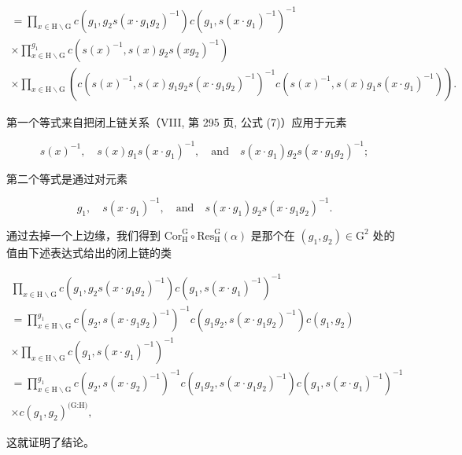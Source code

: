 \[
\begin{array}{l} = \prod_ {x \in \mathrm{H} \backslash \mathrm{G}} c (g _ {1}, g _ {2} s (x \cdot g _ {1} g _ {2}) ^ {- 1}) c (g _ {1}, s (x \cdot g _ {1}) ^ {- 1}) ^ {- 1} \\ \times \prod_ {x \in \mathrm{H} \backslash \mathrm{G}} ^ {g _ {1}} c (s (x) ^ {- 1}, s (x) g _ {2} s (x g _ {2}) ^ {- 1}) \\ \times \prod_ {x \in \mathrm{H} \backslash \mathrm{G}} \left(c (s (x) ^ {- 1}, s (x) g _ {1} g _ {2} s (x \cdot g _ {1} g _ {2}) ^ {- 1}) ^ {- 1} c (s (x) ^ {- 1}, s (x) g _ {1} s (x \cdot g _ {1}) ^ {- 1})\right). \end{array}
\]

第一个等式来自把闭上链关系（VIII, 第 295 页, 公式 (7)）应用于元素

\[
s (x) ^ {- 1}, \quad s (x) g _ {1} s (x \cdot g _ {1}) ^ {- 1}, \quad \mathrm{and} \quad s (x \cdot g _ {1}) g _ {2} s (x \cdot g _ {1} g _ {2}) ^ {- 1};
\]

第二个等式是通过对元素

\[
g _ {1}, \quad s (x \cdot g _ {1}) ^ {- 1}, \quad \mathrm{and} \quad s (x \cdot g _ {1}) g _ {2} s (x \cdot g _ {1} g _ {2}) ^ {- 1}.
\]

通过去掉一个上边缘，我们得到 \(\mathrm{Cor}_{\mathrm{H}}^{\mathrm{G}} \circ \mathrm{Res}_{\mathrm{H}}^{\mathrm{G}}(\alpha)\) 是那个在 \((g_{1}, g_{2}) \in \mathrm{G}^{2}\) 处的值由下述表达式给出的闭上链的类

\[
\begin{array}{l} \prod_ {x \in \mathrm{H} \backslash \mathrm{G}} c (g _ {1}, g _ {2} s (x \cdot g _ {1} g _ {2}) ^ {- 1}) c (g _ {1}, s (x \cdot g _ {1}) ^ {- 1}) ^ {- 1} \\ = \prod_ {x \in \mathrm{H} \backslash \mathrm{G}} ^ {g _ {1}} c (g _ {2}, s (x \cdot g _ {1} g _ {2}) ^ {- 1}) ^ {- 1} c (g _ {1} g _ {2}, s (x \cdot g _ {1} g _ {2}) ^ {- 1}) c (g _ {1}, g _ {2}) \\ \times \prod_ {x \in \mathrm{H} \backslash \mathrm{G}} c (g _ {1}, s (x \cdot g _ {1}) ^ {- 1}) ^ {- 1} \\ = \prod_ {x \in \mathrm{H} \backslash \mathrm{G}} ^ {g _ {1}} c (g _ {2}, s (x \cdot g _ {2}) ^ {- 1}) ^ {- 1} c (g _ {1} g _ {2}, s (x \cdot g _ {1} g _ {2}) ^ {- 1}) c (g _ {1}, s (x \cdot g _ {1}) ^ {- 1}) ^ {- 1} \\ \times c (g _ {1}, g _ {2}) ^ {\text {(G:H)}}, \end{array}
\]

这就证明了结论。

